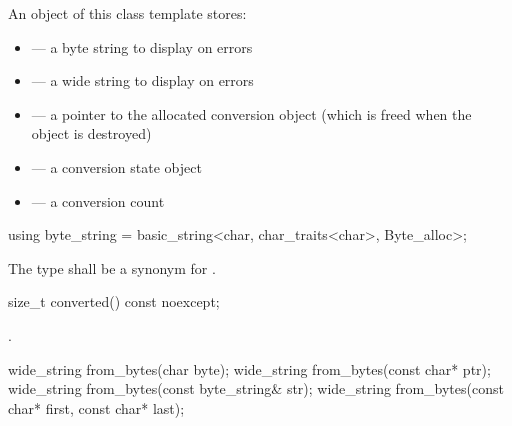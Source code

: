 \pnum
An object of this class template stores:

\begin{itemize}
\item {} --- a byte string to display on errors
\item {} --- a wide string to display on errors
\item {} --- a pointer to the allocated conversion object
(which is freed when the  object is destroyed)
\item {} --- a conversion state object
\item {} --- a conversion count
\end{itemize}

%
\begin{itemdecl}
using byte_string = basic_string<char, char_traits<char>, Byte_alloc>;
\end{itemdecl}

\begin{itemdescr}
\pnum
The type shall be a synonym for .
\end{itemdescr}

%
\begin{itemdecl}
size_t converted() const noexcept;
\end{itemdecl}

\begin{itemdescr}
\pnum
\returns
{}.
\end{itemdescr}

%
\begin{itemdecl}
wide_string from_bytes(char byte);
wide_string from_bytes(const char* ptr);
wide_string from_bytes(const byte_string& str);
wide_string from_bytes(const char* first, const char* last);
\end{itemdecl}

